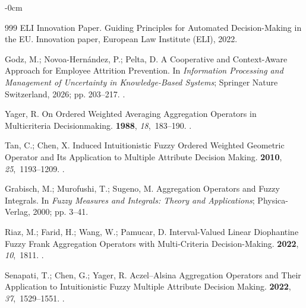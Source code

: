 \documentclass[mathematics,article,submit,moreauthors]{Definitions/mdpi}
\begin{document}
\begin{adjustwidth}{-\extralength}{0cm}
\begin{thebibliography}{999}
    {ELI Innovation Paper}.
    \newblock Guiding Principles for Automated Decision-Making in the {EU}.
    \newblock Innovation paper, European Law Institute (ELI),  2022.
    
    Godz, M.; Novoa-Hernández, P.; Pelta, D.
    \newblock A Cooperative and Context-Aware Approach for Employee Attrition
    Prevention. In {\em Information Processing and Management of Uncertainty in
        Knowledge-Based Systems}; Springer Nature Switzerland,  2026; pp. 203--217.
    .
    
    Yager, R.
    \newblock On Ordered Weighted Averaging Aggregation Operators in Multicriteria
    Decisionmaking.
     {\bf 1988},
    {\em 18},~183--190.
    .
    
    Tan, C.; Chen, X.
    \newblock Induced Intuitionistic Fuzzy Ordered Weighted Geometric Operator and
    Its Application to Multiple Attribute Decision Making.
     {\bf 2010}, {\em
        25},~1193--1209.
    .
    
    Grabisch, M.; Murofushi, T.; Sugeno, M.
    \newblock Aggregation Operators and Fuzzy Integrals. In {\em Fuzzy Measures and
        Integrals: Theory and Applications}; Physica-Verlag,  2000; pp. 3--41.
    
    Riaz, M.; Farid, H.; Wang, W.; Pamucar, D.
    \newblock Interval-Valued Linear Diophantine Fuzzy Frank Aggregation Operators
    with Multi-Criteria Decision-Making.
     {\bf 2022}, {\em 10},~1811.
    .
    
    Senapati, T.; Chen, G.; Yager, R.
    \newblock Aczel--Alsina Aggregation Operators and Their Application to
    Intuitionistic Fuzzy Multiple Attribute Decision Making.
     {\bf 2022}, {\em
        37},~1529--1551.
    .
    

\end{thebibliography}
\end{adjustwidth}
\end{document}
